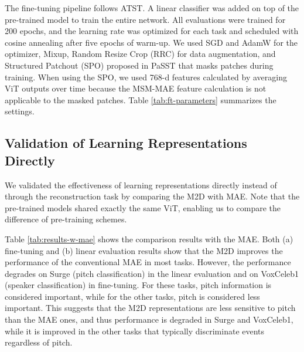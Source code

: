 \documentclass{article}
\begin{document}
The fine-tuning pipeline follows ATST. A linear classifier was added on top of the pre-trained model to train the entire network. All evaluations were trained for 200 epochs, and the learning rate was optimized for each task and scheduled with cosine annealing\cite{loshchilov2016sgdr} after five epochs of warm-up. We used SGD and AdamW for the optimizer, Mixup\cite{zhang2018mixup,niizumi2022byol-a}, Random Resize Crop (RRC)\cite{niizumi2022byol-a} for data augmentation, and Structured Patchout (SPO) proposed in PaSST\cite{Koutini2022passt} that masks patches during training. When using the SPO, we used 768-d features calculated by averaging ViT outputs over time because the MSM-MAE feature calculation is not applicable to the masked patches.
Table \ref{tab:ft-parameters} summarizes the settings.

\begin{table}[htb!]
\vspace{-15pt}
\caption{Fine-tuning settings}
\label{tab:ft-parameters}
\centering
{}
\vspace{-23pt}
\end{table}


\subsection{Validation of Learning Representations Directly} \label{exp:compare-w-mae}
We validated the effectiveness of learning representations directly instead of through the reconstruction task by comparing the M2D with MAE. Note that the pre-trained models shared exactly the same ViT, enabling us to compare the difference of pre-training schemes.

Table \ref{tab:results-w-mae} shows the comparison results with the MAE. Both (a) fine-tuning and (b) linear evaluation results show that the M2D improves the performance of the conventional MAE in most tasks.
However, the performance degrades on Surge (pitch classification) in the linear evaluation and on VoxCeleb1 (speaker classification) in fine-tuning.
For these tasks, pitch information is considered important, while for the other tasks, pitch is considered less important.
This suggests that the M2D representations are less sensitive to pitch than the MAE ones, and thus performance is degraded in Surge and VoxCeleb1, while it is improved in the other tasks that typically discriminate events regardless of pitch.
\end{document}
